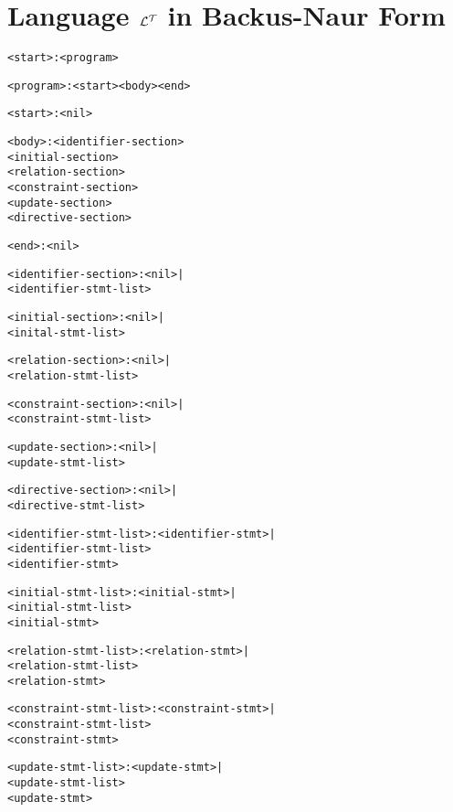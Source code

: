 \documentclass[11pt]{report}
\newenvironment{vverbatim}
{
  \begin{alltt}
}
{
    \vspace{-\baselineskip}
  \end{alltt}
}
\begin{document}
    \section{Language ${\cal L^T}$ in Backus-Naur Form}
      \label{sect-langs-bnflt}

    \begin{vverbatim}
<start>                  : <program>

<program>                : <start> <body> <end>

<start>                  : <nil>

<body>                   : <identifier-section>
                           <initial-section>
                           <relation-section>
                           <constraint-section>
                           <update-section>
                           <directive-section>

<end>                    : <nil>

<identifier-section>     : <nil> |
                           <identifier-stmt-list>

<initial-section>        : <nil> |
                           <inital-stmt-list>

<relation-section>       : <nil> |
                           <relation-stmt-list>

<constraint-section>     : <nil> |
                           <constraint-stmt-list>

<update-section>         : <nil> |
                           <update-stmt-list>

<directive-section>      : <nil> |
                           <directive-stmt-list>

<identifier-stmt-list>   : <identifier-stmt> |
                           <identifier-stmt-list>
                           <identifier-stmt>

<initial-stmt-list>      : <initial-stmt> |
                           <initial-stmt-list>
                           <initial-stmt>

<relation-stmt-list>     : <relation-stmt> |
                           <relation-stmt-list>
                           <relation-stmt>

<constraint-stmt-list>   : <constraint-stmt> |
                           <constraint-stmt-list>
                           <constraint-stmt>

<update-stmt-list>       : <update-stmt> |
                           <update-stmt-list>
                           <update-stmt>


\end{vverbatim}
\end{document}
